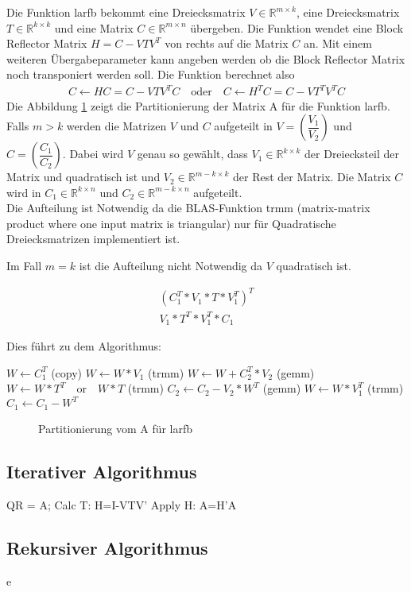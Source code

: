 Die Funktion larfb bekommt eine Dreiecksmatrix $V \in \mathbb{R}^{m \times k}$, eine Dreiecksmatrix $T \in \mathbb{R}^{k \times k}$ und eine Matrix $C \in \mathbb{R}^{m \times n }$ übergeben.
Die Funktion wendet eine  Block Reflector Matrix $ 	H = C - V T V^T $ von rechts auf die Matrix $ C $ an. 
Mit einem weiteren Übergabeparameter kann angeben werden ob die Block Reflector Matrix noch transponiert werden soll.
Die Funktion berechnet also
\begin{align*}
	C \leftarrow H C = C - V T V^T C \quad \text{oder} \quad 	C \leftarrow H^T C = C - V T^T V^T C
\end{align*}
Die Abbildung \ref{fig:patrA} zeigt die Partitionierung der Matrix A für die Funktion larfb.\\
Falls $m > k $ werden die Matrizen $V$ und $C$ aufgeteilt in $V=\left(\dfrac{V_1}{V_2}\right)$ und $C=\left(\dfrac{C_1}{C_2}\right)$. Dabei wird $V$ genau so gewählt, dass $V_1 \in \mathbb{R}^{k\times k}$ der Dreiecksteil der Matrix und quadratisch ist und $V_2 \in \mathbb{R}^{m-k\times k}$ der Rest der Matrix. Die Matrix $C$ wird in $C_1 \in \mathbb{R}^{k \times n}$ und $C_2 \in \mathbb{R}^{m-k \times n}$  aufgeteilt.\\
Die Aufteilung ist Notwendig da die BLAS-Funktion trmm (matrix-matrix product where one input matrix is triangular) nur für Quadratische Dreiecksmatrizen implementiert ist.

Im Fall $ m = k $ ist die Aufteilung nicht Notwendig da $ V $ quadratisch ist.

\begin{align*}
	(C_1^T * V_1 * T *V_1^T)^T\\
	V_1 * T^T * V_1^T * C_1
\end{align*}



Dies führt zu dem Algorithmus:

\begin{algorithmic}
	\State 	$W \leftarrow C_1^T$ (copy)
	\State	$W \leftarrow W * V_1 $ (trmm)
		\State $W \leftarrow W + C_2^T*V_2$ (gemm)
	\EndIf
	\State 	$ W \leftarrow W * T^T \quad \text{or}\quad  W * T$ (trmm)
		\State $C_2 \leftarrow C_2 - V_2 * W^T$ (gemm)
	\EndIf
	\State 	$ W \leftarrow W * V_1^T $ (trmm)
	\State 	$ C_1 \leftarrow C_1 - W^T $
\end{algorithmic}



\begin{figure} 
	\centering
	
	\caption{Partitionierung vom A für larfb}
	\label{fig:patrA}
\end{figure}


\subsection{Iterativer Algorithmus}

\begin{algorithmic}
	\State QR = A;
		\State Calc T: H=I-VTV'
		\State Apply H: A=H'A
	\EndIf
\EndFor

\end{algorithmic}


\subsection{Rekursiver Algorithmus}


e